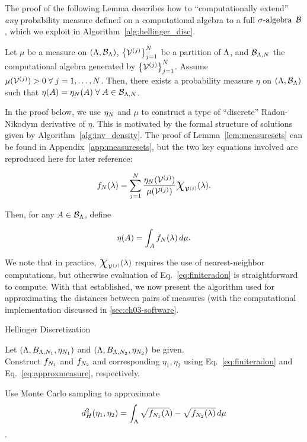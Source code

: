 The proof of the following Lemma describes how to ``computationally extend'' {\em any} probability measure defined on a computational algebra to a full $\sigma\text{-algebra}$ $\mathcal{B}$, which we exploit in Algorithm~\ref{alg:hellinger_disc}.
\begin{lem}
\label{lem:measuresets}
Let $\mu$ be a measure on $({\Lambda}, \mathcal{B}_{\Lambda})$, $\left\{\mathcal{V}^{(j)}\right\}_{j=1}^{N}$ be a partition of ${\Lambda}$, and $\mathcal{B}_{{\Lambda}, N}$ the computational algebra generated by $\left\{\mathcal{V}^{(j)}\right\}_{j=1}^{N}$.
Assume $\mu (\mathcal{V}^{(j)}) > 0 \; \forall \; j=1,\hdots, N$.
Then, there exists a probability measure $\eta$ on $({\Lambda}, \mathcal{B}_{\Lambda})$ such that $\eta(A) = \eta_N(A) \; \forall \; A\in\mathcal{B}_{{\Lambda}, N}$.
\end{lem}
In the proof below, we use $\eta_N$ and $\mu$ to construct a type of ``discrete'' Radon-Nikodym derivative of $\eta$.
This is motivated by the formal structure of solutions given by Algorithm~\ref{alg:inv_density}.
The proof of Lemma~\ref{lem:measuresets} can be found in Appendix~\ref{app:measuresets}, but the two key equations involved are reproduced here for later reference:

\begin{equation}\label{eq:finiteradon}
f_\nsamps (\param) = \sum_{j=1}^{\nsamps} \frac{\eta_\nsamps (\VV^{(j)}) }{\mu (\VV^{(j)})} \Chi_{\VV^{(j)}} (\param).
\end{equation}

Then, for any $A\in\mathcal{B}_{\Lambda}$, define

\begin{equation}\label{eq:approxmeasure}
\eta (A) = \int_A f_N (\lambda) \, d\mu.
\end{equation}

We note that in practice, $\Chi_{\VV^{(j)}} (\param)$ requires the use of nearest-neighbor computations, but otherwise evaluation of Eq.~\eqref{eq:finiteradon} is straightforward to compute.
With that established, we now present the algorithm used for approximating the distances between pairs of measures (with the computational implementation discussed in \ref{sec:ch03-software}.


\begin{algorithm}
\DontPrintSemicolon
\caption{Hellinger Discretization}
\label{alg:hellinger_disc}
Let $({\Lambda}, B_{{\Lambda}, N_1}, \eta_{N_1} )$ and $({\Lambda}, B_{{\Lambda}, N_2}, \eta_{N_2} )$ be given.\\

Construct $f_{N_1}$ and $f_{N_2}$ and corresponding $\eta_1, \eta_2$ using Eq.~\eqref{eq:finiteradon} and Eq.~\eqref{eq:approxmeasure}, respectively.

Use Monte Carlo sampling to approximate
$$ d^2_H(\eta_1, \eta_2) = \int_{\Lambda} \sqrt{f_{N_1}(\lambda}) - \sqrt{f_{N_2}(\lambda)} \, d\mu $$.
\end{algorithm}

